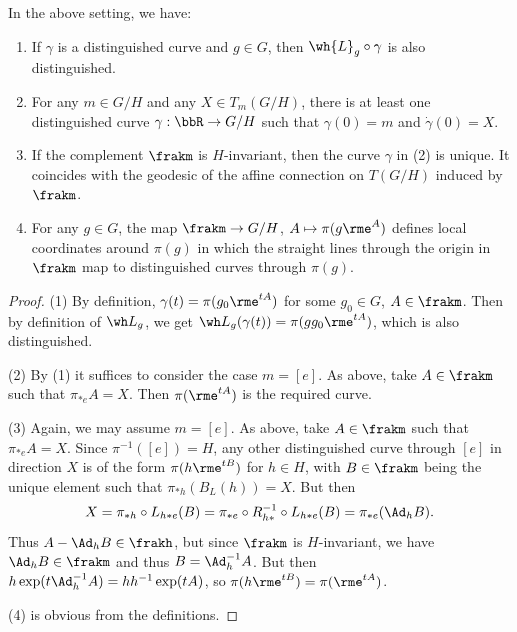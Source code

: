 \begin{prop}\label{prop 1.4.11 Cap}
    In the above setting, we have: 
    \begin{enumerate}[label=(\arabic*)]
        \item If $\gamma$ is a distinguished curve and $g\in G$, then $\wh{L}_g\circ\gamma$ is also distinguished.
        \item For any $m\in G\slash H$ and any $X\in T_m(G\slash H)$, there is at least one distinguished curve $\gamma:\bbR\to G\slash H$ such that $\gamma(0)=m$ and $\dot\gamma(0)=X$.
        \item If the complement $\frakm$ is $H$-invariant, then the curve $\gamma$ in (2) is unique. It coincides with the geodesic of the affine connection on $T(G\slash H)$ induced by $\frakm$.
        \item For any $g\in G$, the map $\frakm\to G\slash H$, $A\mapsto \pi(g\rme^A)$ defines local coordinates around $\pi(g)$ in which the straight lines through the origin in $\frakm$ map to distinguished curves through $\pi(g)$.
    \end{enumerate}
\end{prop}
\begin{proof}
    (1) By definition, $\gamma(t)=\pi(g_0\rme^{tA})$ for some $g_0\in G$, $A\in\frakm$. Then by definition of $\wh L_g$, we get $\wh L_g(\gamma(t))=\pi(gg_0\rme^{tA})$, which is also distinguished.

    (2) By (1) it suffices to consider the case $m=[e]$. As above, take $A\in\frakm$ such that $\pi_{\ast e}A=X$. Then $\pi(\rme^{tA})$ is the required curve.

    (3) Again, we may assume $m=[e]$. As above, take $A\in\frakm$ such that $\pi_{\ast e}A=X$. Since $\pi^{-1}([e])=H$, any other distinguished curve through $[e]$ in direction $X$ is of the form $\pi(h\rme^{tB})$ for $h\in H$, with $B\in\frakm$ being the unique element such that $\pi_{\ast h}(B_L(h))=X$. But then 
    \[X=\pi_{\ast h}\circ L_{h\ast e}(B)=\pi_{\ast e}\circ R_{h\ast}^{-1}\circ L_{h\ast e}(B)=\pi_{\ast e}(\Ad_h B).\]
    Thus $A-\Ad_h B\in\frakh$, but since $\frakm$ is $H$-invariant, we have $\Ad_h B\in\frakm$ and thus $B=\Ad_h^{-1}A$. But then $h\exp(t\Ad_{h}^{-1}A)=hh^{-1}\exp(tA)$, so $\pi(h\rme^{tB})=\pi(\rme^{tA})$.

    (4) is obvious from the definitions.
\end{proof}

